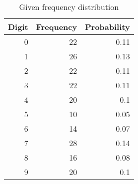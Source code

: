 
\begin{table}[htbp]
\renewcommand\thetable{1}
  \centering
  \caption{Given frequency distribution}
    \begin{tabular}{|r|r|r|}
    \toprule
    \hline
    \multicolumn{1}{|c|}{\textbf{Digit}} & \multicolumn{1}{c|}{\textbf{Frequency}} & \multicolumn{1}{c|}{\textbf{Probability}} \\
    \midrule
    \hline
    0     & 22    & 0.11 \\
    1     & 26    & 0.13 \\
    2     & 22    & 0.11 \\
    3     & 22    & 0.11 \\
    4     & 20    & 0.1 \\
    5     & 10    & 0.05 \\
    6     & 14    & 0.07 \\
    7     & 28    & 0.14 \\
    8     & 16    & 0.08 \\
    9     & 20    & 0.1 \\
    \hline
    \end{tabular}%
  \label{tab:givendistribution}%
\end{table}%
